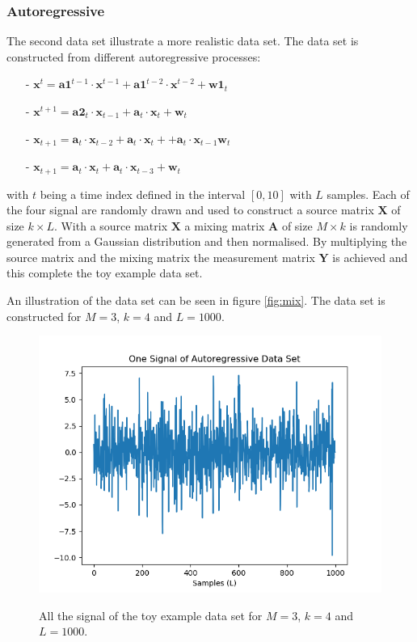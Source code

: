 \subsubsection{Autoregressive}
The second data set illustrate a more realistic data set.
The data set is constructed from different autoregressive processes: 
\begin{itemize}
\item[-] $\mathbf{x}^{t} = \mathbf{a1}^{t-1} \cdot \mathbf{x}^{t-1} + \mathbf{a1}^{t-2} \cdot \mathbf{x}^{t-2} + \mathbf{w1}_t$
\item[-] $\mathbf{x}^{t+1} = \mathbf{a2}_t \cdot \mathbf{x}_{t-1} + \mathbf{a}_t \cdot \mathbf{x}_t + \mathbf{w}_t$
\item[-] $\mathbf{x}_{t+1} = \mathbf{a}_t \cdot \mathbf{x}_{t-2} + \mathbf{a}_t \cdot \mathbf{x}_t + + \mathbf{a}_t \cdot \mathbf{x}_{t-1} \mathbf{w}_t$
\item[-] $\mathbf{x}_{t+1} = \mathbf{a}_t \cdot \mathbf{x}_t + \mathbf{a}_t \cdot \mathbf{x}_{t-3} + \mathbf{w}_t$
\end{itemize}
with $t$ being a time index defined in the interval $[0,10]$ with $L$ samples. Each of the four signal are randomly drawn and used to construct a source matrix $\mathbf{X}$ of size $k \times L$. 
With a source matrix $\mathbf{X}$ a mixing matrix $\mathbf{A}$ of size $M \times k$ is randomly generated from a Gaussian distribution and then normalised. By multiplying the source matrix and the mixing matrix the measurement matrix $\mathbf{Y}$ is achieved and this complete the toy example data set.

An illustration of the data set can be seen in figure \ref{fig:mix}. The data set is constructed for $M = 3$, $k = 4$ and $L = 1000$.
\begin{figure}[H]
\centering
\includegraphics[scale=0.5]{figures/chapter6/AR_Data_m3_n4_k4_L1000.png}
\label{fig:AR}
\caption{All the signal of the toy example data set for $M = 3$, $k=4$ and $L=1000$.}
\end{figure}
\noindent

